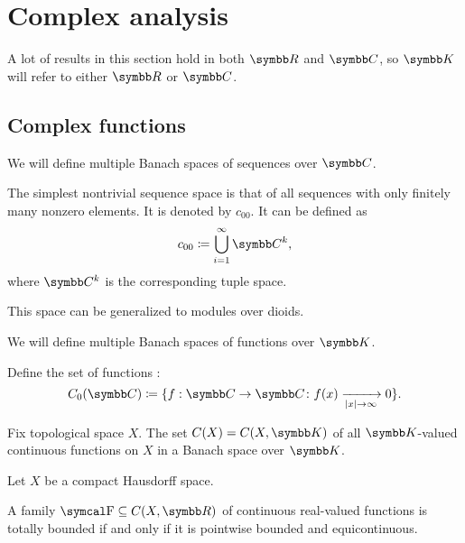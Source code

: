 \section{Complex analysis}\label{sec:complex_analysis}

A lot of results in this section hold in both \( \R \) and \( \C \), so \( \K \) will refer to either \( \R \) or \( \C \).

\subsection{Complex functions}\label{subsec:complex_functions}

\begin{definition}\label{def:sequence_spaces}
  We will define multiple Banach spaces of sequences over \( \C \).

  \begin{defenum}
     The simplest nontrivial sequence space is that of all sequences with only finitely many nonzero elements. It is denoted by \( c_{00} \). It can be defined as
    \begin{equation*}
      c_{00} \coloneqq \bigcup_{i=1}^\infty \C^k,
    \end{equation*}
    where \( \C^k \) is the corresponding tuple space.

    This space can be generalized to modules over dioids.
  \end{defenum}
\end{definition}

\begin{definition}\label{def:function_spaces}
  We will define multiple Banach spaces of functions over \( \K \).

  \begin{defenum}
     Define the set of functions :
    \begin{equation*}
      C_0(\C) \coloneqq \{ f: \C \to \C \colon f(x) \xrightarrow[\Abs{x} \to \infty]{} 0 \}.
    \end{equation*}

     Fix topological space \( X \). The set \( C(X) = C(X, \K) \) of all \( \K \)-valued continuous functions on \( X \) in a Banach space over \( \K \).
  \end{defenum}
\end{definition}

\begin{theorem}\label{thm:arzela_ascoli}\cite[corollary 10.49]{Knapp2016BAlg}
  Let \( X \) be a compact Hausdorff space.

  A family \( \F \subseteq C(X, \R) \) of continuous real-valued functions is totally bounded if and only if it is pointwise bounded and equicontinuous.
\end{theorem}
